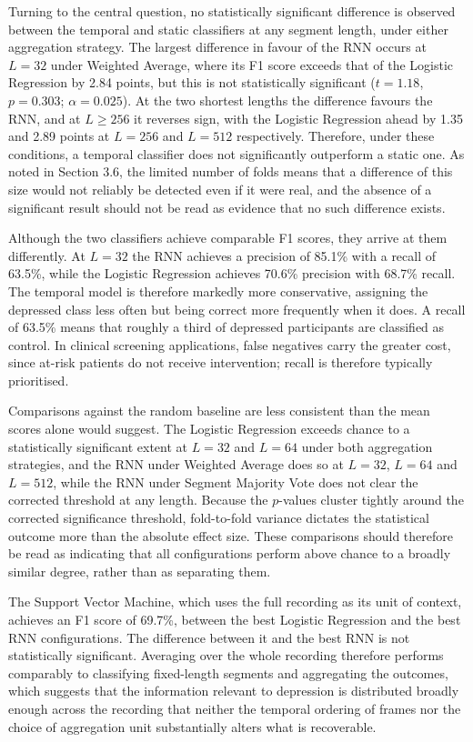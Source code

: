 \documentclass{mproj}
\begin{document}
Turning to the central question, no statistically significant difference is observed between the temporal and static classifiers at any segment length, under either aggregation strategy. The largest difference in favour of the RNN occurs at $L = 32$ under Weighted Average, where its F1 score exceeds that of the Logistic Regression by 2.84 points, but this is not statistically significant ($t = 1.18$, $p = 0.303$; $\alpha = 0.025$). At the two shortest lengths the difference favours the RNN, and at $L \geq 256$ it reverses sign, with the Logistic Regression ahead by 1.35 and 2.89 points at $L = 256$ and $L = 512$ respectively. Therefore, under these conditions, a temporal classifier does not significantly outperform a static one. As noted in Section 3.6, the limited number of folds means that a difference of this size would not reliably be detected even if it were real, and the absence of a significant result should not be read as evidence that no such difference exists.

Although the two classifiers achieve comparable F1 scores, they arrive at them differently. At $L = 32$ the RNN achieves a precision of 85.1\% with a recall of 63.5\%, while the Logistic Regression achieves 70.6\% precision with 68.7\% recall. The temporal model is therefore markedly more conservative, assigning the depressed class less often but being correct more frequently when it does. A recall of 63.5\% means that roughly a third of depressed participants are classified as control. In clinical screening applications, false negatives carry the greater cost, since at-risk patients do not receive intervention; recall is therefore typically prioritised.

Comparisons against the random baseline are less consistent than the mean scores alone would suggest. The Logistic Regression exceeds chance to a statistically significant extent at $L = 32$ and $L = 64$ under both aggregation strategies, and the RNN under Weighted Average does so at $L = 32$, $L = 64$ and $L = 512$, while the RNN under Segment Majority Vote does not clear the corrected threshold at any length. Because the $p$-values cluster tightly around the corrected significance threshold, fold-to-fold variance dictates the statistical outcome more than the absolute effect size. These comparisons should therefore be read as indicating that all configurations perform above chance to a broadly similar degree, rather than as separating them.

The Support Vector Machine, which uses the full recording as its unit of context, achieves an F1 score of 69.7\%, between the best Logistic Regression and the best RNN configurations. The difference between it and the best RNN is not statistically significant. Averaging over the whole recording therefore performs comparably to classifying fixed-length segments and aggregating the outcomes, which suggests that the information relevant to depression is distributed broadly enough across the recording that neither the temporal ordering of frames nor the choice of aggregation unit substantially alters what is recoverable.
\end{document}
